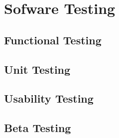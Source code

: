 \chapter{Sofware Testing}

\section{Functional Testing}

\section{Unit Testing}

\section{Usability Testing}

\section{Beta Testing}
